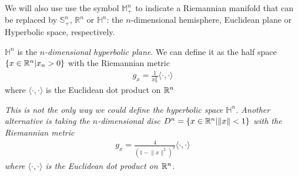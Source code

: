 We will also use use the symbol $\mathbb{M}^n_+$ to indicate a Riemannian manifold that can be replaced by $\mathbb{S}^n_+$, $\mathbb{R}^n$ or $\mathbb{H}^n$: the $n$-dimensional hemisphere, Euclidean plane or Hyperbolic space, respectively.


\begin{defin}
	$\mathbb{H}^n$ is the {\em $n$-dimensional hyperbolic plane}. We can define it as the half space $\{x\in \mathbb{R}^n|x_n > 0\}$ with the Riemannian metric
	\begin{align*}
		g_x=\frac{1}{x_n^2} \langle\cdot, \cdot \rangle
	\end{align*}
	where $\langle\cdot, \cdot \rangle$ is the Euclidean dot product on $\mathbb{R}^n$
\end{defin}


\begin{oss}
	\em This is not the only way we could define the hyperbolic space $\mathbb{H}^n$. Another alternative is taking the $n$-dimensional disc $D^n = \{x\in \mathbb{R}^n|\lVert x \rVert  < 1 \}$ with the Riemannian metric 
	\begin{align*}
		g_x=\frac{4}{(1-\lVert x \rVert^2)^2} \langle\cdot, \cdot \rangle
	\end{align*}
	where $\langle\cdot, \cdot \rangle$ is the Euclidean dot product on $\mathbb{R}^n$.
\end{oss}

